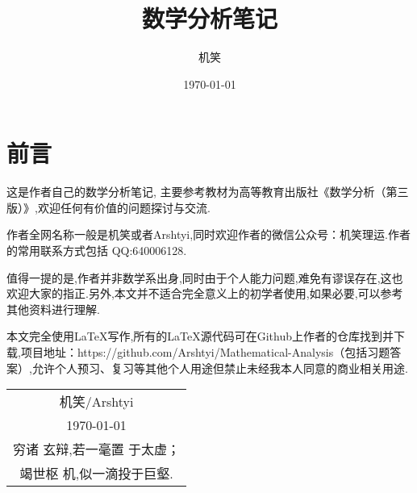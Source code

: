 \documentclass[12pt,a4paper,UTF8,oneside]{ctexbook}
\title{\textbf{数学分析笔记}}
\author{机笑}
\date{\today}
\theoremstyle{mydefinition}
\begin{document}
\thispagestyle{empty}
\maketitle
\thispagestyle{empty}
\newpage
\section*{前言}
\thispagestyle{empty}
这是作者自己的数学分析笔记,
主要参考教材为高等教育出版社《数学分析（第三版）》,欢迎任何有价值的问题探讨与交流.

作者全网名称一般是机笑或者Arshtyi,同时欢迎作者的微信公众号：机笑理运.作者的常用联系方式包括 QQ:640006128.

值得一提的是,作者并非数学系出身,同时由于个人能力问题,难免有谬误存在,这也欢迎大家的指正.另外,本文并不适合完全意义上的初学者使用,如果必要,可以参考其他资料进行理解.

本文完全使用\LaTeX 写作,所有的\LaTeX 源代码可在Github上作者的仓库找到并下载,项目地址：https://github.com/Arshtyi/Mathematical-Analysis（包括习题答案）,允许个人预习、复习等其他个人用途但禁止未经我本人同意的商业相关用途.
\begin{flushright}
    \begin{tabular}{c}
        机笑/Arshtyi\\
        \today \\ 穷诸
        玄辩,若一毫置
        于太虚；\\ 竭世枢
        机,似一滴投于巨壑.
    \end{tabular}
\end{flushright}
\thispagestyle{empty}

\newpage
{}
\setcounter{page}{1}
\pagestyle{plain}
\tableofcontents
\newpage
\setcounter{page}{1}
\pagestyle{plain}



\newpage
\nocite{*}

\clearpage
{}
{}

\end{document}
